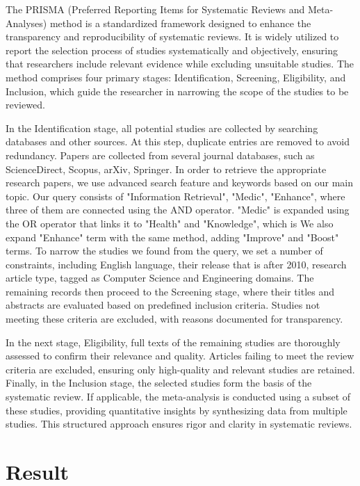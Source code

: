 \documentclass[conference]{IEEEtran}
\begin{document}
The PRISMA (Preferred Reporting Items for Systematic Reviews and Meta-Analyses) method is a standardized framework designed to enhance the transparency and reproducibility of systematic reviews. It is widely utilized to report the selection process of studies systematically and objectively, ensuring that researchers include relevant evidence while excluding unsuitable studies. The method comprises four primary stages: Identification, Screening, Eligibility, and Inclusion, which guide the researcher in narrowing the scope of the studies to be reviewed.

In the Identification stage, all potential studies are collected by searching databases and other sources. At this step, duplicate entries are removed to avoid redundancy. Papers are collected from several journal databases, such as ScienceDirect, Scopus, arXiv, Springer. In order to retrieve the appropriate research papers, we use advanced search feature and keywords based on our main topic. Our query consists of "Information Retrieval", "Medic", "Enhance", where three of them are connected using the AND operator. "Medic" is expanded using the OR operator that links it to "Health" and "Knowledge", which is We also expand "Enhance" term with the same method, adding "Improve" and "Boost" terms. To narrow the studies we found from the query, we set a number of constraints, including English language, their release that is after 2010, research article type, tagged as Computer Science and Engineering domains. The remaining records then proceed to the Screening stage, where their titles and abstracts are evaluated based on predefined inclusion criteria. Studies not meeting these criteria are excluded, with reasons documented for transparency.

In the next stage, Eligibility, full texts of the remaining studies are thoroughly assessed to confirm their relevance and quality. Articles failing to meet the review criteria are excluded, ensuring only high-quality and relevant studies are retained. Finally, in the Inclusion stage, the selected studies form the basis of the systematic review. If applicable, the meta-analysis is conducted using a subset of these studies, providing quantitative insights by synthesizing data from multiple studies. This structured approach ensures rigor and clarity in systematic reviews.

\section{Result}
\end{document}
